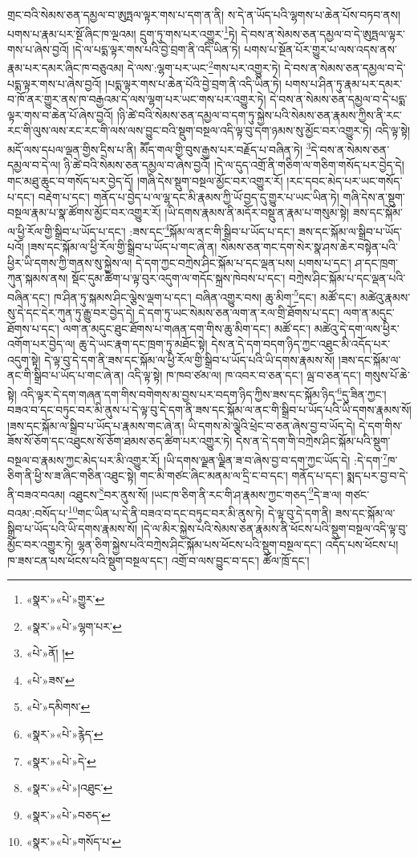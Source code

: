 གྲང་བའི་སེམས་ཅན་དམྱལ་བ་ཨུཏྤལ་ལྟར་གས་པ་དག་ན་ནི། ས་དེ་ན་ཡོད་པའི་ལྷགས་པ་ཆེན་པོས་བཏབ་ནས། པགས་པ་རྣམ་པར་སྔོ་ཞིང་ཁ་ལྔའམ། དྲུག་ཏུ་གས་པར་འགྱུར་\footnote{«སྣར་»«པེ་»གྱུར་}ཏེ། དེ་བས་ན་སེམས་ཅན་དམྱལ་བ་དེ་ཨུཏྤལ་ལྟར་གས་པ་ཞེས་བྱའོ། །དེ་ལ་པདྨ་ལྟར་གས་པའི་བྱེ་བྲག་ནི་འདི་ཡིན་ཏེ། པགས་པ་སྔོན་པོར་གྱུར་པ་ལས་འདས་ནས་རྣམ་པར་དམར་ཞིང་ཁ་བཅུའམ། དེ་ལས་:ལྷག་པར་ཡང་\footnote{«སྣར་»«པེ་»ལྷག་པར་}གས་པར་འགྱུར་ཏེ། དེ་བས་ན་སེམས་ཅན་དམྱལ་བ་དེ་པདྨ་ལྟར་གས་པ་ཞེས་བྱའོ། །པདྨ་ལྟར་གས་པ་ཆེན་པོའི་བྱེ་བྲག་ནི་འདི་ཡིན་ཏེ། པགས་པ་ཤིན་ཏུ་རྣམ་པར་དམར་བ་ཁོ་ནར་གྱུར་ནས་ཁ་བརྒྱའམ་དེ་ལས་ལྷག་པར་ཡང་གས་པར་འགྱུར་ཏེ། དེ་བས་ན་སེམས་ཅན་དམྱལ་བ་དེ་པདྨ་ལྟར་གས་བ་ཆེན་པོ་ཞེས་བྱའོ། །ཉི་ཚེ་བའི་སེམས་ཅན་དམྱལ་བ་དག་ཏུ་སྐྱེས་པའི་སེམས་ཅན་རྣམས་ཀྱིས་ནི་རང་རང་གི་ལུས་ལས་རང་རང་གི་ལས་ལས་བྱུང་བའི་སྡུག་བསྔལ་འདི་ལྟ་བུ་དག་ཉམས་སུ་མྱོང་བར་འགྱུར་ཏེ། འདི་ལྟ་སྟེ། མདོ་ལས་དཔལ་ལྡན་གྱིས་དྲིས་པ་ནི། མཽད་གལ་གྱི་བུས་རྒྱས་པར་བརྗོད་པ་བཞིན་ཏེ། \footnote{«པེ་»ནོ། ། }དེ་བས་ན་སེམས་ཅན་དམྱལ་བ་དེ་ལ། ཉི་ཚེ་བའི་སེམས་ཅན་དམྱལ་བ་ཞེས་བྱའོ། །དེ་ལ་དུད་འགྲོ་ནི་གཅིག་ལ་གཅིག་གསོད་པར་བྱེད་དེ། གང་མཐུ་ཆུང་བ་གསོད་པར་བྱེད་དོ། །གཞི་དེས་སྡུག་བསྔལ་མྱོང་བར་འགྱུར་རོ། །རང་དབང་མེད་པར་ཡང་གསོད་པ་དང་། བརྡེག་པ་དང་། གནོད་པ་བྱེད་པ་ལ་ལྷ་དང་མི་རྣམས་ཀྱི་ཡོ་བྱད་དུ་གྱུར་པ་ཡང་ཡིན་ཏེ། གཞི་དེས་ན་སྡུག་བསྔལ་རྣམ་པ་སྣ་ཚོགས་མྱོང་བར་འགྱུར་རོ། །ཡི་དགས་རྣམས་ནི་མདོར་བསྡུ་ན་རྣམ་པ་གསུམ་སྟེ། ཟས་དང་སྐོམ་ལ་ཕྱི་རོལ་གྱི་སྒྲིབ་པ་ཡོད་པ་དང་། :ཟས་དང་\footnote{«པེ་»ཟས་}སྐོམ་ལ་ནང་གི་སྒྲིབ་པ་ཡོད་པ་དང་། ཟས་དང་སྐོམ་ལ་སྒྲིབ་པ་ཡོད་པའོ། །ཟས་དང་སྐོམ་ལ་ཕྱི་རོལ་གྱི་སྒྲིབ་པ་ཡོད་པ་གང་ཞེ་ན། སེམས་ཅན་གང་དག་སེར་སྣ་ཤས་ཆེར་བསྟེན་པའི་ཕྱིར་ཡི་དགས་ཀྱི་གནས་སུ་སྐྱེས་ལ། དེ་དག་ཀྱང་བཀྲེས་ཤིང་སྐོམ་པ་དང་ལྡན་པས། པགས་པ་དང་། ཤ་དང་ཁྲག་ཀུན་སྐམས་ནས། སྡོང་དུམ་ཚིག་པ་ལྟ་བུར་འདུག་ལ་གདོང་སྐྲས་ཁེབས་པ་དང་། བཀྲེས་ཤིང་སྐོམ་པ་དང་ལྡན་པའི་བཞིན་དང་། ཁ་ཤིན་ཏུ་སྐམས་ཤིང་ལྕེས་ལྡག་པ་དང་། བཞིན་འགྱུར་བས། ཆུ་མིག་\footnote{«པེ་»དམིགས་}དང་། མཚོ་དང་། མཚེའུ་རྣམས་སུ་དེ་དང་དེར་ཀུན་ཏུ་རྒྱུ་བར་བྱེད་དེ། དེ་དག་ཏུ་ཡང་སེམས་ཅན་ལག་ན་རལ་གྲི་ཐོགས་པ་དང་། ལག་ན་མདུང་ཐོགས་པ་དང་། ལག་ན་མདུང་ཐུང་ཐོགས་པ་གཞན་དག་གིས་ཆུ་མིག་དང་། མཚོ་དང་། མཚེའུ་དེ་དག་ལས་ཕྱིར་འགོག་པར་བྱེད་ལ། ཆུ་དེ་ཡང་རྣག་དང་ཁྲག་ཏུ་མཐོང་སྟེ། དེས་ན་དེ་དག་བདག་ཉིད་ཀྱང་འཐུང་མི་འདོད་པར་འདུག་སྟེ། དེ་ལྟ་བུ་དེ་དག་ནི་ཟས་དང་སྐོམ་ལ་ཕྱི་རོལ་གྱི་སྒྲིབ་པ་ཡོད་པའི་ཡི་དགས་རྣམས་སོ། །ཟས་དང་སྐོམ་ལ་ནང་གི་སྒྲིབ་པ་ཡོད་པ་གང་ཞེ་ན། འདི་ལྟ་སྟེ། ཁ་ཁབ་ཙམ་ལ། ཁ་འབར་བ་ཅན་དང་། ལྦ་བ་ཅན་དང་། གསུས་པོ་ཆེ་སྟེ། འདི་ལྟར་དེ་དག་གཞན་དག་གིས་བགེགས་མ་བྱས་པར་བདག་ཉིད་ཀྱིས་ཟས་དང་སྐོམ་ཉིད་\footnote{«སྣར་»«པེ་»རྙེད་}དུ་ཟིན་ཀྱང་། བཟའ་བ་དང་བཏུང་བར་མི་ནུས་པ་དེ་ལྟ་བུ་དེ་དག་ནི་ཟས་དང་སྐོམ་ལ་ནང་གི་སྒྲིབ་པ་ཡོད་པའི་ཡི་དགས་རྣམས་སོ། །ཟས་དང་སྐོམ་ལ་སྒྲིབ་པ་ཡོད་པ་རྣམས་གང་ཞེ་ན། ཡི་དགས་མེ་ལྕེའི་ཕྲེང་བ་ཅན་ཞེས་བྱ་བ་ཡོད་དེ། དེ་དག་གིས་ཟོས་སོ་ཅོག་དང་འཐུངས་སོ་ཅོག་ཐམས་ཅད་ཚིག་པར་འགྱུར་ཏེ། དེས་ན་དེ་དག་གི་བཀྲེས་ཤིང་སྐོམ་པའི་སྡུག་བསྔལ་བ་རྣམས་ཀྱང་མེད་པར་མི་འགྱུར་རོ། །ཡི་དགས་ལྗན་ལྗིན་ཟ་བ་ཞེས་བྱ་བ་དག་ཀྱང་ཡོད་དེ། :དེ་དག་\footnote{«སྣར་»«པེ་»དེ་}ཁ་ཅིག་ནི་ཕྱི་ས་ཟ་ཞིང་གཅིན་འཐུང་སྟེ། གང་མི་གཙང་ཞིང་མནམ་ལ་དྲི་ང་བ་དང་། གནོད་པ་དང་། སྨད་པར་བྱ་བ་དེ་ནི་བཟའ་བའམ། འཐུངས་\footnote{«སྣར་»«པེ་»།འཐུང་}བར་ནུས་སོ། །ཡང་ཁ་ཅིག་ནི་རང་གི་ཤ་རྣམས་ཀྱང་གཅད་\footnote{«སྣར་»«པེ་»བཅད་}དེ་ཟ་ལ། གཙང་བའམ་:བསོད་པ་\footnote{«སྣར་»«པེ་»གསོད་པ་}གང་ཡིན་པ་དེ་ནི་བཟའ་བ་དང་བཏུང་བར་མི་ནུས་ཏེ། དེ་ལྟ་བུ་དེ་དག་ནི། ཟས་དང་སྐོམ་ལ་སྒྲིབ་པ་ཡོད་པའི་ཡི་དགས་རྣམས་སོ། །དེ་ལ་མིར་སྐྱེས་པའི་སེམས་ཅན་རྣམས་ནི་ཕོངས་པའི་སྡུག་བསྔལ་འདི་ལྟ་བུ་མྱོང་བར་འགྱུར་ཏེ། ལྷན་ཅིག་སྐྱེས་པའི་བཀྲེས་ཤིང་སྐོམ་པས་ཕོངས་པའི་སྡུག་བསྔལ་དང་། འདོད་པས་ཕོངས་པ། ཁ་ཟས་ངན་པས་ཕོངས་པའི་སྡུག་བསྔལ་དང་། འགྲོ་བ་ལས་བྱུང་བ་དང་། ཚོལ་ཁྲོ་དང་། 
